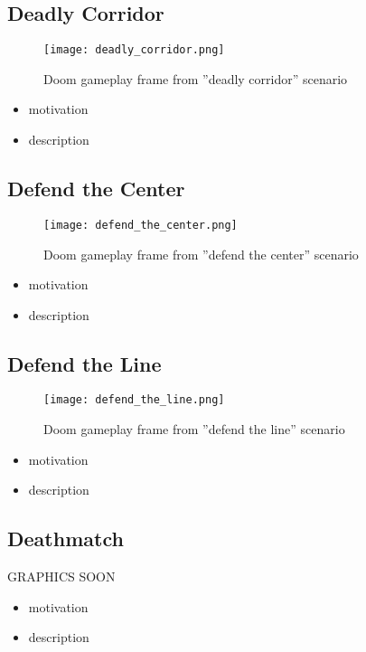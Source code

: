 \newpage
\subsection{Deadly Corridor}
	\begin{figure}[h]
		\centering
		\texttt{[image: deadly\_corridor.png]}
		\caption{Doom gameplay frame from ''deadly corridor'' scenario}
	\end{figure}
\begin{itemize}
	\item motivation
	\item description
\end{itemize}
\newpage

\subsection{Defend the Center}
	\begin{figure}[h]
		\centering
		\texttt{[image: defend\_the\_center.png]}
		\caption{Doom gameplay frame from ''defend the center'' scenario}
	\end{figure}
\begin{itemize}
	\item motivation
	\item description
\end{itemize}

\newpage
\subsection{Defend the Line}
	\begin{figure}[h]
		\centering
		\texttt{[image: defend\_the\_line.png]}
		\caption{Doom gameplay frame from ''defend the line'' scenario}
	\end{figure}
\begin{itemize}
	\item motivation
	\item description
\end{itemize}

\newpage
\subsection{Deathmatch}
	GRAPHICS SOON
\begin{itemize}
	\item motivation
	\item description
\end{itemize}

